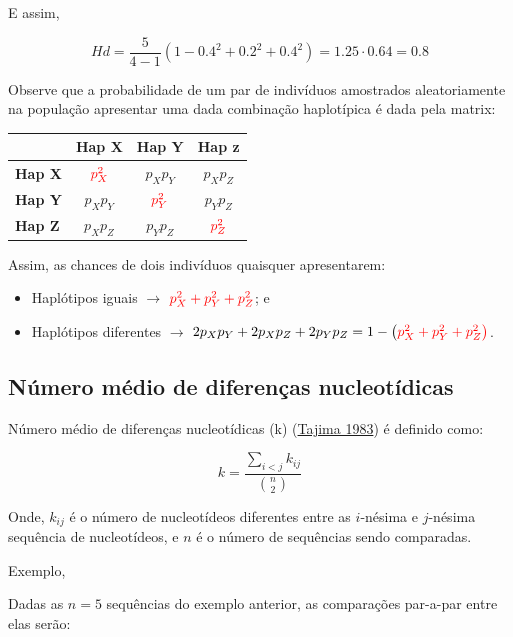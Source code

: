 \documentclass[
]{book}
\begin{document}
E assim,

\[Hd = \frac{5}{4-1} \left( 1 - 0.4^2 + 0.2^2 + 0.4^2 \right) = 1.25 \cdot 0.64 = 0.8\]

Observe que a probabilidade de um par de indivíduos amostrados aleatoriamente na população apresentar uma dada combinação haplotípica é dada pela matrix:

\begin{longtable}[]{@{}lccc@{}}
\toprule()
& Hap X & Hap Y & Hap z \\
\midrule()
\endhead
\textbf{Hap X} & \(\color{red}{p_X^2}\) & \(p_Xp_Y\) & \(p_Xp_Z\) \\
\textbf{Hap Y} & \(p_Xp_Y\) & \(\color{red}{p_Y^2}\) & \(p_Yp_Z\) \\
\textbf{Hap Z} & \(p_Xp_Z\) & \(p_Yp_Z\) & \(\color{red}{p_Z^2}\) \\
\bottomrule()
\end{longtable}

Assim, as chances de dois indivíduos quaisquer apresentarem:

\begin{itemize}
\item
  Haplótipos iguais \(\rightarrow\) \(\color{red}{p_X^2 + p_Y^2 + p_Z^2}\); e
\item
  Haplótipos diferentes \(\rightarrow\) \(2p_Xp_Y + 2p_Xp_Z + 2p_Yp_Z = 1 - \left( \color{red}{p_X^2 + p_Y^2 + p_Z^2} \right)\).
\end{itemize}

\hypertarget{nuxfamero-muxe9dio-de-diferenuxe7as-nucleotuxeddicas}{%
\subsection{Número médio de diferenças nucleotídicas}\label{nuxfamero-muxe9dio-de-diferenuxe7as-nucleotuxeddicas}}

Número médio de diferenças nucleotídicas (k) (\href{https://doi.org/10.1093/genetics/105.2.437}{Tajima 1983}) é definido como:

\begin{equation} 
k = \frac { \sum_{i<j}^{} k_{ij} } { \binom{n}{2} }
  \label{eq:nucleotidedifferences}
\end{equation}

Onde,
\(k_{ij}\) é o número de nucleotídeos diferentes entre as \(i\)-nésima e \(j\)-nésima sequência de nucleotídeos, e
\(n\) é o número de sequências sendo comparadas.

Exemplo,

Dadas as \(n=5\) sequências do exemplo anterior, as comparações par-a-par entre elas serão:
\end{document}
